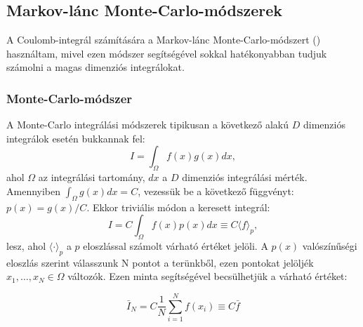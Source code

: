 \documentclass[11pt,a4paper]{article}
\numberwithin{equation}{subsection}
\numberwithin{figure}{section}
\begin{document}
\subsection{Markov-lánc Monte-Carlo-módszerek}

A Coulomb-integrál számítására a Markov-lánc Monte-Carlo-módszert (\cite{mcbook}) használtam, mivel ezen módszer segítségével sokkal hatékonyabban tudjuk számolni a magas dimenziós integrálokat.

\subsubsection{Monte-Carlo-módszer}

A Monte-Carlo integrálási módszerek tipikusan a következő alakú  $D$ dimenziós integrálok esetén bukkannak fel:
\begin{equation}
I=\int_\Omega f(x)g(x) dx,
\end{equation}
ahol $\Omega$ az integrálási tartomány, $dx$ a $D$ dimenziós integrálási mérték. Amennyiben $\int_\Omega g(x)dx = C$, vezessük be a következő függvényt: $p(x)=g(x)/C$. Ekkor triviális módon a keresett integrál: 
\begin{equation}
I=C\int_\Omega f(x)p(x)dx \equiv C\langle f \rangle_p,
\end{equation}
lesz, ahol  $\langle \cdot \rangle_p$ a $p$ eloszlással számolt várható értéket jelöli.
A $p(x)$ valószínűségi eloszlás szerint válasszunk N pontot a terünkből, ezen pontokat jelöljék $x_1,\dots,x_N\in\Omega$ változók. Ezen minta segítségével becsülhetjük a várható értéket:

\begin{equation}
\bar{I}_N = C\frac{1}{N}\sum_{i=1}^N f(x_i)\equiv C\bar{f}
\label{eq:IN}
\end{equation} 
\end{document}
